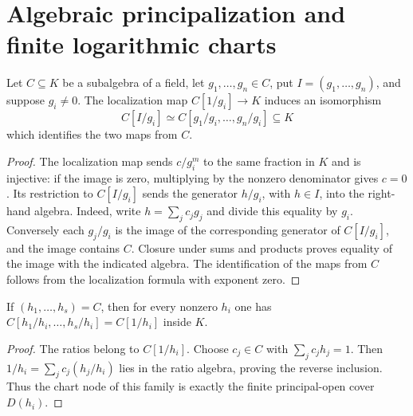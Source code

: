 \section{Algebraic principalization and finite logarithmic charts}

\begin{lemma}\label{lem:sc0-hironaka-affine-chart}
\leanok
{}
Let $C\subseteq K$ be a subalgebra of a field, let $g_1,\ldots,g_n\in C$, put
$I=(g_1,\ldots,g_n)$, and suppose $g_i\ne0$. The localization map $C[1/g_i]\to K$
induces an isomorphism
\[
 C[I/g_i]\simeq C[g_1/g_i,\ldots,g_n/g_i]\subseteq K
\]
which identifies the two maps from $C$.
\end{lemma}
\begin{proof}
The localization map sends $c/g_i^m$ to the same fraction in $K$ and is injective: if the
image is zero, multiplying by the nonzero denominator gives $c=0$. Its restriction to
$C[I/g_i]$ sends the generator $h/g_i$, with $h\in I$, into the right-hand algebra.
Indeed, write $h=\sum_j c_jg_j$ and divide this equality by $g_i$. Conversely each $g_j/g_i$
is the image of the corresponding generator of $C[I/g_i]$, and the image contains $C$.
Closure under sums and products proves equality of the image with the indicated algebra.
The identification of the maps from $C$ follows from the localization formula with exponent zero.
\end{proof}

\begin{lemma}\label{lem:sc0-principal-cover-chart}
\leanok
{}
If $(h_1,\ldots,h_s)=C$, then for every nonzero $h_i$ one has
$C[h_1/h_i,\ldots,h_s/h_i]=C[1/h_i]$ inside $K$.
\end{lemma}
\begin{proof}
The ratios belong to $C[1/h_i]$. Choose $c_j\in C$ with $\sum_jc_jh_j=1$.
Then $1/h_i=\sum_jc_j(h_j/h_i)$ lies in the ratio algebra, proving the reverse inclusion.
Thus the chart node of this family is exactly the finite principal-open cover $D(h_i)$.
\end{proof}

